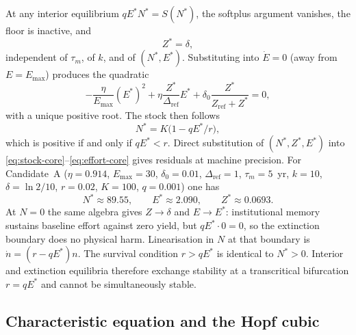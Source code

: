 \documentclass[11pt]{article}
\theoremstyle{definition}
\begin{document}
At any interior equilibrium $qE^*N^*=S(N^*)$, the softplus argument vanishes, the floor is inactive, and
\begin{equation}
Z^*=\delta,
\end{equation}
independent of $\tau_m$, of $k$, and of $(N^*,E^*)$. Substituting into $\dot E=0$ (away from $E=E_{\max}$) produces the quadratic
\begin{equation}
-\frac{\eta}{E_{\max}}(E^*)^2+\eta\frac{Z^*}{\Delta_{\mathrm{ref}}}E^*+\delta_0\frac{Z^*}{Z_{\mathrm{ref}}+Z^*}=0,
\label{eq:Estar-quadratic}
\end{equation}
with a unique positive root. The stock then follows
\begin{equation}
N^*=K\bigl(1-qE^*/r\bigr),
\label{eq:Nstar}
\end{equation}
which is positive if and only if $qE^*<r$. Direct substitution of $(N^*,Z^*,E^*)$ into \eqref{eq:stock-core}--\eqref{eq:effort-core} gives residuals at machine precision. For Candidate~A ($\eta=0.914$, $E_{\max}=30$, $\delta_0=0.01$, $\Delta_{\mathrm{ref}}=1$, $\tau_m=5$~yr, $k=10$, $\delta=\ln 2/10$, $r=0.02$, $K=100$, $q=0.001$) one has
\[
N^*\approx 89.55,\qquad E^*\approx 2.090,\qquad Z^*\approx 0.0693.
\]
At $N=0$ the same algebra gives $Z\to\delta$ and $E\to E^*$: institutional memory sustains baseline effort against zero yield, but $qE^*\cdot 0=0$, so the extinction boundary does no physical harm. Linearisation in $N$ at that boundary is $\dot n=(r-qE^*)n$. The survival condition $r>qE^*$ is identical to $N^*>0$. Interior and extinction equilibria therefore exchange stability at a transcritical bifurcation $r=qE^*$ and cannot be simultaneously stable.

\subsection{Characteristic equation and the Hopf cubic}
\end{document}
